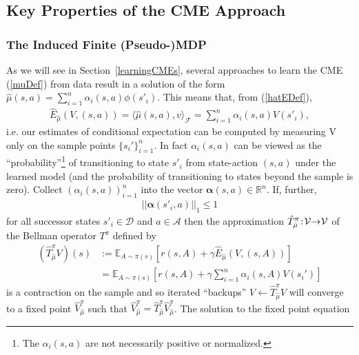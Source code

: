 \documentclass[letterpaper]{article}
\newcommand{\cD}{{\mathcal D}}
\newcommand{\cF}{{\mathcal F}}
\newcommand{\cA}{{\mathcal A}}
\newcommand{\cV}{{\mathcal V}}
\newcommand{\balpha}{{\bm \alpha}}
\newcommand{\E}{{\mathbb E}}
\newcommand{\R}{{\mathbb R}}
\newcommand{\lang}{\langle}
\newcommand{\rang}{\rangle}
\newcommand{\nn}{\nonumber}
\begin{document}

\subsection{Key Properties of the CME Approach}

\subsubsection{The Induced Finite (Pseudo-)MDP} \label{InducedMDP}

As we will see in Section~\ref{learningCMEs}, several approaches to learn the CME (\ref{muDef}) from data result in a solution of the form $\hat \mu(s,a) = \sum_{i=1}^n \alpha_i(s,a) \phi(s'_i)$. This means that, from (\ref{hatEDef}),
\begin{align}
\hat E_{\hat\mu}(V,(s,a)) = \lang \hat \mu(s,a) , v \rang_\cF =\sum_{i=1}^n \alpha_i(s,a) V(s'_i), \label{finiteExpansion}
\end{align}
i.e. our estimates of conditional expectation can be computed by measuring V only on the sample points $\{ s_i'\}_{i=1}^n$. In fact $\alpha_i(s,a)$ can be viewed as the ``probability''\footnote{The $\alpha_i(s,a)$ are not necessarily positive or normalized.} of transitioning to state $s'_i$ from state-action $(s,a)$ under the learned model (and the probability of transitioning to states beyond the sample is zero). Collect $(\alpha_i(s,a))_{i=1}^n$ into the vector $\balpha(s,a)\in \R^n$.
If, further,
\begin{align}
||\balpha(s'_i,a)||_1 \le 1 \label{L1Constraint}
\end{align}
for all successor states $s'_i\in\cD$ and $a\in\cA$ then the approximation  $\hat T^\pi_{\hat \mu}\hspace{-0.6mm}:\hspace{-0.6mm}\cV\hspace{-0.9mm}\to\hspace{-0.9mm}\cV$ of the Bellman operator $T^\pi$ defined by
\begin{align}
(\hat T^\pi_{\hat \mu}V)(s)&:=  \E_{A\sim\pi(s)} [ r(s,A) + \gamma \hat E_{\hat \mu}(V, (s,A))] \nn\\
&= \E_{A\sim\pi(s)} [ r(s,A) + \gamma \sum_{i=1}^n \alpha_i(s,A)V(s_i') ] \label{approxBellman}
\end{align}
is a contraction on the sample and so iterated ``backups'' $V\leftarrow \hat T^\pi_{\hat \mu}V$ will converge to a fixed point $\hat V_{\hat \mu}^{\pi}$ such that $\hat V_{\hat \mu}^{\pi} = \hat T^\pi_{\hat \mu} \hat V_{\hat \mu}^{\pi}$. The solution to the fixed point equation
\end{document}
